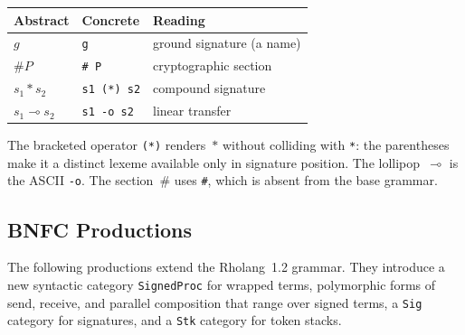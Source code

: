 \documentclass[11pt,a4paper]{article}
\newcommand{\comp}{\mathbin{*}}
\newcommand{\hashf}{\texttt{\#}}
\begin{document}
\begin{center}
  \begin{tabular}{lll}
    \textbf{Abstract} & \textbf{Concrete} & \textbf{Reading} \\
    \midrule
    $g$        & \verb|g|          & ground signature (a name) \\
    $\hashf P$ & \verb|# P|        & cryptographic section \\
    $s_1 \comp s_2$ & \verb|s1 (*) s2| & compound signature \\
    $s_1 \multimap s_2$ & \verb|s1 -o s2| & linear transfer \\
  \end{tabular}
\end{center}

\noindent
The bracketed operator \verb|(*)| renders~$\comp$ without
colliding with \texttt{*}: the parentheses make it a distinct
lexeme available only in signature position.  The
lollipop~$\multimap$ is the ASCII \verb|-o|.  The
section~$\hashf$ uses \verb|#|, which is absent from the base
grammar.

\subsection{BNFC Productions}
\label{app:concrete-bnfc}

The following productions extend the Rholang~1.2 grammar.  They
introduce a new syntactic category \texttt{SignedProc} for
wrapped terms, polymorphic forms of send, receive, and parallel
composition that range over signed terms, a \texttt{Sig}
category for signatures, and a \texttt{Stk} category for token
stacks.
\end{document}
